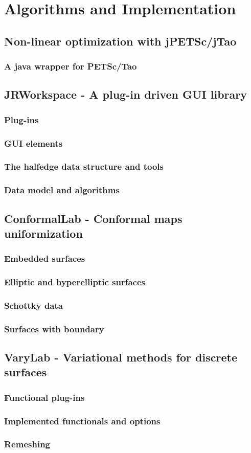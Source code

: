 \chapter{Algorithms and Implementation}

\section{Non-linear optimization with jPETSc/jTao}
\subsection{A java wrapper for PETSc/Tao}

\section{JRWorkspace - A plug-in driven GUI library}
\subsection{Plug-ins}
\subsection{GUI elements}
\subsection{The halfedge data structure and tools}
\subsection{Data model and algorithms}

\section{ConformalLab - Conformal maps uniformization}
\subsection{Embedded surfaces}
\subsection{Elliptic and hyperelliptic surfaces}
\subsection{Schottky data}
\subsection{Surfaces with boundary}

\section{VaryLab - Variational methods for discrete surfaces}
\subsection{Functional plug-ins}
\subsection{Implemented functionals and options}
\subsection{Remeshing}

